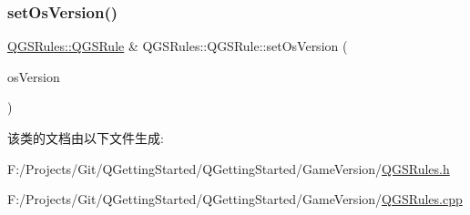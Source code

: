 \mbox{\label{class_q_g_s_rules_1_1_q_g_s_rule_ac91e028168c81ea0b884a13b86561af4}} 
\subsubsection{\texorpdfstring{set\+Os\+Version()}{setOsVersion()}}
{\footnotesize\ttfamily \mbox{\hyperlink{class_q_g_s_rules_1_1_q_g_s_rule}{Q\+G\+S\+Rules\+::\+Q\+G\+S\+Rule}} \& Q\+G\+S\+Rules\+::\+Q\+G\+S\+Rule\+::set\+Os\+Version (\begin{DoxyParamCaption}\item[{const Q\+String \&}]{os\+Version }\end{DoxyParamCaption})}



该类的文档由以下文件生成\+:\begin{DoxyCompactItemize}
\item 
F\+:/\+Projects/\+Git/\+Q\+Getting\+Started/\+Q\+Getting\+Started/\+Game\+Version/\mbox{\hyperlink{_q_g_s_rules_8h}{Q\+G\+S\+Rules.\+h}}\item 
F\+:/\+Projects/\+Git/\+Q\+Getting\+Started/\+Q\+Getting\+Started/\+Game\+Version/\mbox{\hyperlink{_q_g_s_rules_8cpp}{Q\+G\+S\+Rules.\+cpp}}\end{DoxyCompactItemize}
